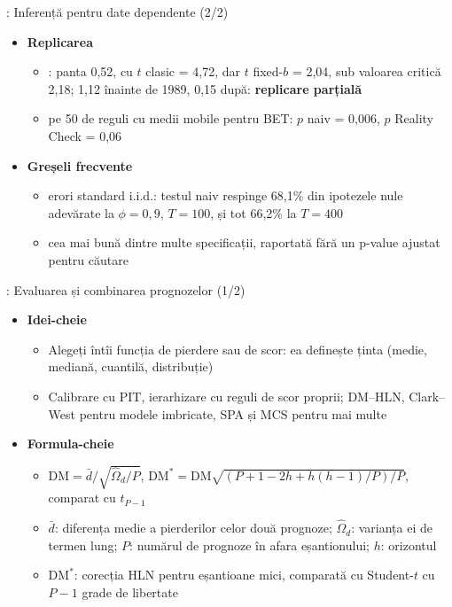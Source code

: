 \begin{frame}{: Inferență pentru date dependente (2/2)}
\itemsize{\small}
\begin{itemize}
    \item \textbf{Replicarea}
    \begin{itemize}
        \item {}: panta 0{,}52, cu $t$ clasic = 4{,}72, dar $t$ fixed-$b$ = 2{,}04, sub valoarea critică 2{,}18; 1{,}12 înainte de 1989, 0{,}15 după: \textbf{replicare parțială}
        \item {} pe 50 de reguli cu medii mobile pentru BET: $p$ naiv = 0{,}006, $p$ Reality Check = 0{,}06
    \end{itemize}
    \item \textbf{Greșeli frecvente}
    \begin{itemize}
        \item erori standard i.i.d.: testul naiv respinge 68{,}1\% din ipotezele nule adevărate la $\phi = 0{,}9$, $T = 100$, și tot 66{,}2\% la $T = 400$
        \item cea mai bună dintre multe specificații, raportată fără un p-value ajustat pentru căutare
    \end{itemize}
\end{itemize}
\end{frame}

\begin{frame}{: Evaluarea și combinarea prognozelor (1/2)}
\itemsize{\footnotesize}
\begin{itemize}
    \item \textbf{Idei-cheie}
    \begin{itemize}
        \item Alegeți întîi funcția de pierdere sau de scor: ea definește ținta (medie, mediană, cuantilă, distribuție)
        \item Calibrare cu PIT, ierarhizare cu reguli de scor proprii; DM--HLN, Clark--West pentru modele imbricate, SPA și MCS pentru mai multe
    \end{itemize}
    \item \textbf{Formula-cheie}
    \begin{itemize}
        \item $\mathrm{DM} = \bar d/\sqrt{\hat\Omega_d/P}$, $\mathrm{DM}^* = \mathrm{DM}\sqrt{(P + 1 - 2h + h(h - 1)/P)/P}$, comparat cu $t_{P-1}$
        \item $\bar d$: diferența medie a pierderilor celor două prognoze; $\hat\Omega_d$: varianța ei de termen lung; $P$: numărul de prognoze în afara eșantionului; $h$: orizontul
        \item $\mathrm{DM}^*$: corecția HLN pentru eșantioane mici, comparată cu Student-$t$ cu $P - 1$ grade de libertate
    \end{itemize}
\end{itemize}
\end{frame}

